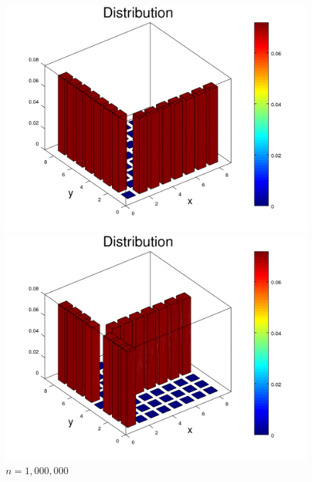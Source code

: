 \documentclass{amsart}
\numberwithin{equation}{section}
\begin{document}
\begin{figure}[!h]
    \centering
   \begin{minipage}{0.50\textwidth}
     \centering
     \includegraphics[width=1.0\linewidth]{figures/regular/figure_Rook_moveFixedOrigin_N1000000_x1_y1.png}
     \captionsetup{labelformat=empty}
     \caption*{$n=1,000,000$}
   \end{minipage}\hfil
   \begin{minipage}{0.50\textwidth}
     \centering
     \includegraphics[width=1.0\linewidth]{figures/regular/figure_Rook_moveFixedOrigin_N1000000_x1_y4.png}
     \captionsetup*{labelformat=empty}
     \caption{$n=1,000,000$}
   \end{minipage}\hfil
   \begin{minipage}{0.50\textwidth}

\end{minipage}
\end{figure}
\end{document}
